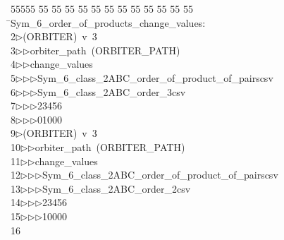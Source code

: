 %
%
\begin{tabbing}
55555 \= 55 \= 55 \= 55 \= 55 \= 55 \= 55 \= 55 \= 55 \= 55 \= 55 \= 55 \= 55 \= \>Sym\_6\_order\_of\_products\_change\_values:\\[0pt]
2\>$\triangleright$\>(ORBITER)\ v\ 3\ \\[0pt]
3\>$\triangleright$\>$\triangleright$\>orbiter\_path\ (ORBITER\_PATH)\ \\[0pt]
4\>$\triangleright$\>$\triangleright$\>change\_values\ \\[0pt]
5\>$\triangleright$\>$\triangleright$\>$\triangleright$\>Sym\_6\_class\_2ABC\_order\_of\_product\_of\_pairscsv\ \\[0pt]
6\>$\triangleright$\>$\triangleright$\>$\triangleright$\>Sym\_6\_class\_2ABC\_order\_3csv\ \\[0pt]
7\>$\triangleright$\>$\triangleright$\>$\triangleright$23456\ \\[0pt]
8\>$\triangleright$\>$\triangleright$\>$\triangleright$01000\\[0pt]
9\>$\triangleright$\>(ORBITER)\ v\ 3\ \\[0pt]
10\>$\triangleright$\>$\triangleright$\>orbiter\_path\ (ORBITER\_PATH)\ \\[0pt]
11\>$\triangleright$\>$\triangleright$\>change\_values\ \\[0pt]
12\>$\triangleright$\>$\triangleright$\>$\triangleright$\>Sym\_6\_class\_2ABC\_order\_of\_product\_of\_pairscsv\ \\[0pt]
13\>$\triangleright$\>$\triangleright$\>$\triangleright$\>Sym\_6\_class\_2ABC\_order\_2csv\ \\[0pt]
14\>$\triangleright$\>$\triangleright$\>$\triangleright$23456\ \\[0pt]
15\>$\triangleright$\>$\triangleright$\>$\triangleright$10000\\[0pt]
16\>\end{tabbing}
